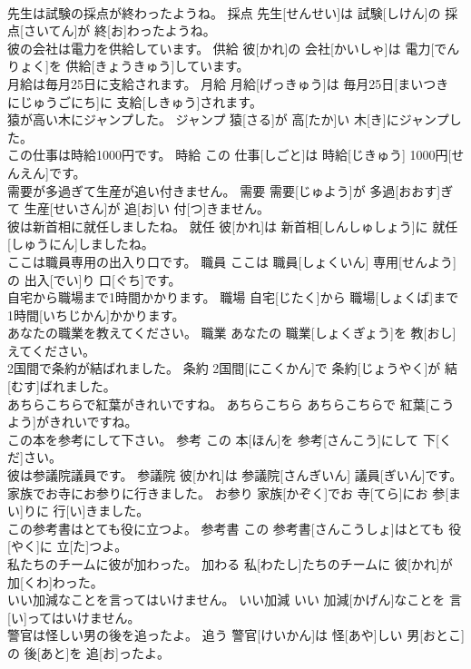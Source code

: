 \documentclass[8pt]{extreport}
\begin{document}
\begin{CJK}{UTF8}{min}
\\	先生は試験の採点が終わったようね。	採点	先生[せんせい]は 試験[しけん]の 採点[さいてん]が 終[お]わったようね。	
\\	彼の会社は電力を供給しています。	供給	彼[かれ]の 会社[かいしゃ]は 電力[でんりょく]を 供給[きょうきゅう]しています。	
\\	月給は毎月25日に支給されます。	月給	月給[げっきゅう]は 毎月25日[まいつき にじゅうごにち]に 支給[しきゅう]されます。	
\\	猿が高い木にジャンプした。	ジャンプ	猿[さる]が 高[たか]い 木[き]にジャンプした。	
\\	この仕事は時給1000円です。	時給	この 仕事[しごと]は 時給[じきゅう] 1000円[せんえん]です。	
\\	需要が多過ぎて生産が追い付きません。	需要	需要[じゅよう]が 多過[おおす]ぎて 生産[せいさん]が 追[お]い 付[つ]きません。	
\\	彼は新首相に就任しましたね。	就任	彼[かれ]は 新首相[しんしゅしょう]に 就任[しゅうにん]しましたね。	
\\	ここは職員専用の出入り口です。	職員	ここは 職員[しょくいん] 専用[せんよう]の 出入[でい]り 口[ぐち]です。	
\\	自宅から職場まで1時間かかります。	職場	自宅[じたく]から 職場[しょくば]まで 1時間[いちじかん]かかります。	
\\	あなたの職業を教えてください。	職業	あなたの 職業[しょくぎょう]を 教[おし]えてください。	
\\	2国間で条約が結ばれました。	条約	2国間[にこくかん]で 条約[じょうやく]が 結[むす]ばれました。	
\\	あちらこちらで紅葉がきれいですね。	あちらこちら	あちらこちらで 紅葉[こうよう]がきれいですね。	
\\	この本を参考にして下さい。	参考	この 本[ほん]を 参考[さんこう]にして 下[くだ]さい。	
\\	彼は参議院議員です。	参議院	彼[かれ]は 参議院[さんぎいん] 議員[ぎいん]です。	
\\	家族でお寺にお参りに行きました。	お参り	家族[かぞく]でお 寺[てら]にお 参[まい]りに 行[い]きました。	
\\	この参考書はとても役に立つよ。	参考書	この 参考書[さんこうしょ]はとても 役[やく]に 立[た]つよ。	
\\	私たちのチームに彼が加わった。	加わる	私[わたし]たちのチームに 彼[かれ]が 加[くわ]わった。	
\\	いい加減なことを言ってはいけません。	いい加減	いい 加減[かげん]なことを 言[い]ってはいけません。	
\\	警官は怪しい男の後を追ったよ。	追う	警官[けいかん]は 怪[あや]しい 男[おとこ]の 後[あと]を 追[お]ったよ。	

\end{CJK}
\end{document}

